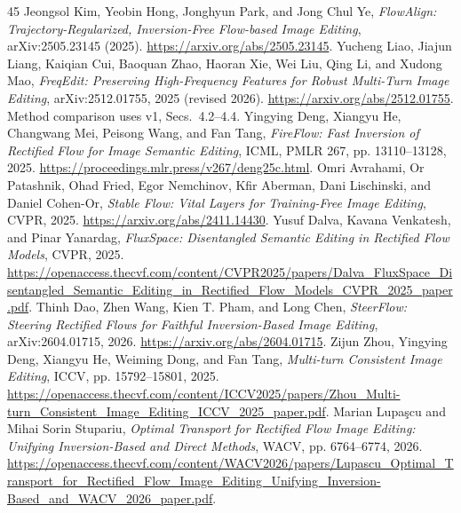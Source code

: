 \documentclass[conference]{IEEEtran}
\begin{document}
\begin{thebibliography}{45}
 Jeongsol Kim, Yeobin Hong, Jonghyun Park, and Jong Chul Ye, \textit{FlowAlign: Trajectory-Regularized, Inversion-Free Flow-based Image Editing}, arXiv:2505.23145 (2025). \url{https://arxiv.org/abs/2505.23145}.
 Yucheng Liao, Jiajun Liang, Kaiqian Cui, Baoquan Zhao, Haoran Xie, Wei Liu, Qing Li, and Xudong Mao, \textit{FreqEdit: Preserving High-Frequency Features for Robust Multi-Turn Image Editing}, arXiv:2512.01755, 2025 (revised 2026). \url{https://arxiv.org/abs/2512.01755}. Method comparison uses v1, Secs.~4.2--4.4.
 Yingying Deng, Xiangyu He, Changwang Mei, Peisong Wang, and Fan Tang, \textit{FireFlow: Fast Inversion of Rectified Flow for Image Semantic Editing}, ICML, PMLR 267, pp. 13110--13128, 2025. \url{https://proceedings.mlr.press/v267/deng25c.html}.
 Omri Avrahami, Or Patashnik, Ohad Fried, Egor Nemchinov, Kfir Aberman, Dani Lischinski, and Daniel Cohen-Or, \textit{Stable Flow: Vital Layers for Training-Free Image Editing}, CVPR, 2025. \url{https://arxiv.org/abs/2411.14430}.
 Yusuf Dalva, Kavana Venkatesh, and Pinar Yanardag, \textit{FluxSpace: Disentangled Semantic Editing in Rectified Flow Models}, CVPR, 2025. \url{https://openaccess.thecvf.com/content/CVPR2025/papers/Dalva_FluxSpace_Disentangled_Semantic_Editing_in_Rectified_Flow_Models_CVPR_2025_paper.pdf}.
 Thinh Dao, Zhen Wang, Kien T. Pham, and Long Chen, \textit{SteerFlow: Steering Rectified Flows for Faithful Inversion-Based Image Editing}, arXiv:2604.01715, 2026. \url{https://arxiv.org/abs/2604.01715}.
 Zijun Zhou, Yingying Deng, Xiangyu He, Weiming Dong, and Fan Tang, \textit{Multi-turn Consistent Image Editing}, ICCV, pp. 15792--15801, 2025. \url{https://openaccess.thecvf.com/content/ICCV2025/papers/Zhou_Multi-turn_Consistent_Image_Editing_ICCV_2025_paper.pdf}.
 Marian Lupa\c{s}cu and Mihai Sorin Stupariu, \textit{Optimal Transport for Rectified Flow Image Editing: Unifying Inversion-Based and Direct Methods}, WACV, pp. 6764--6774, 2026. \url{https://openaccess.thecvf.com/content/WACV2026/papers/Lupascu_Optimal_Transport_for_Rectified_Flow_Image_Editing_Unifying_Inversion-Based_and_WACV_2026_paper.pdf}.



\end{thebibliography}
\end{document}
